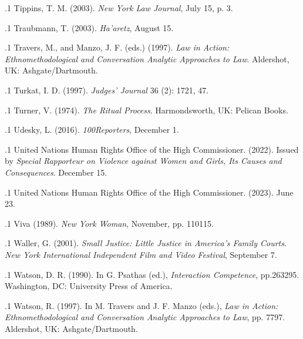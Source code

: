 \documentclass[11pt, twoside]{article}
\begin{document}
{{\p.1{%
Tippins, T. M. (2003).  \textit{New York
Law Journal}, July 15, p. 3.
}%

\p.1{%
Traubmann, T. (2003).  \textit{Ha’aretz}, August 15.
}%

\p.1{%
Travers, M., and Manzo, J. F. (eds.) (1997). \textit{Law in Action: Ethnomethodological and
Conversation Analytic Approaches to Law}. Aldershot, UK: Ashgate/Dartmouth.
}%

\p.1{%
Turkat, I. D. (1997).  \textit{Judges’ Journal} 36 (2):
17\ndash{}21, 47.
}%

\p.1{%
Turner, V. (1974). \textit{The Ritual Process}. Harmondsworth, UK: Pelican Books.
}%

\p.1{%
Udesky, L. (2016).  \textit{100Reporters}, December 1.
}%

\p.1{%
United Nations Human Rights Office of the High Commissioner. (2022). 
Issued by \textit{Special Rapporteur on Violence against Women and Girls, Its Causes and
Consequences}. December 15.
}%

\p.1{%
United Nations Human Rights Office of the High Commissioner. (2023).  June 23.
}%

\p.1{%
Viva (1989).  \textit{New York Woman}, November, pp.\@
110\ndash{}115.
}%

\p.1{%
Waller, G. (2001). \textit{Small Justice: Little Justice in America’s Family Courts}. \textit{New York
International Independent Film and Video Festival}, September 7.
}%

\p.1{%
Watson, D. R. (1990).  In G. Psathas (ed.), \textit{Interaction Competence}, pp.\@ 263\ndash{}295.
Washington, DC: University Press of America.
}%

\p.1{%
Watson, R. (1997).  In M. Travers and J. F. Manzo (eds.), \textit{Law
in Action: Ethnomethodological and Conversation Analytic Approaches to Law}, pp.\@
77\ndash{}97. Aldershot, UK: Ashgate/Dartmouth.\vspace{-1em}
}%

}}
\end{document}
